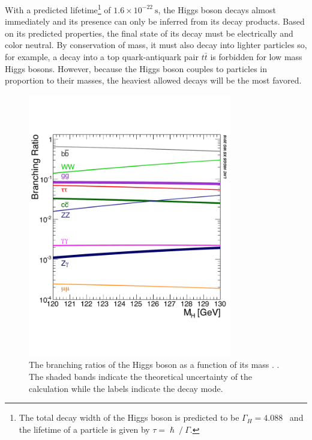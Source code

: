 With a predicted lifetime\footnote{The total decay width of the Higgs boson is predicted to be $\Gamma_{H} = 4.088$ \MeV\ and the lifetime of a particle is given by $\tau = \hslash\ /\ \Gamma$.} of $1.6 \times 10^{-22}\ \mathrm{s}$, the Higgs boson decays almost immediately and its presence can only be inferred from its decay products. Based on its predicted properties, the final state of its decay must be electrically and color neutral. By conservation of mass, it must also decay into lighter particles so, for example, a decay into a top quark-antiquark pair $t\bar{t}$ is forbidden for low mass Higgs bosons. However, because the Higgs boson couples to particles in proportion to their masses, the heaviest allowed decays will be the most favored.

\begin{figure}[htbp]
  \centering
    \includegraphics[width=3.5in]{images/SMHiggsBR-YR4-square}
    \caption[Higgs Boson Branching Ratios]{The branching ratios of the Higgs boson as a function of its mass \massH. \cite{CERNYR4}. The shaded bands indicate the theoretical uncertainty of the calculation while the labels indicate the decay mode.}
    \label{fig:higgsbrplots}
\end{figure}

